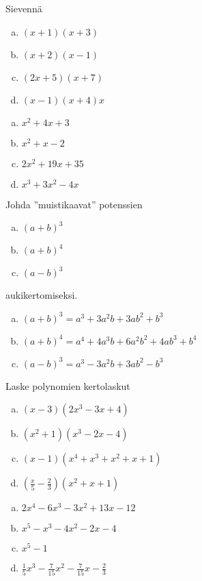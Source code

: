 \begin{tehtava}
    Sievennä
    \begin{enumerate}[a)]
        \item $(x+1)(x+3)$
        \item $(x+2)(x-1)$
        \item $(2x+5)(x+7)$
        \item $(x-1)(x+4)x$
    \end{enumerate}
    \begin{vastaus}
        \begin{enumerate}[a)]
            \item $x^2 + 4x + 3$
            \item $x^2 + x - 2$
            \item $2x^2 + 19x + 35$
            \item $x^3 + 3x^2 - 4x$
        \end{enumerate}
    \end{vastaus}
\end{tehtava}

\begin{tehtava}
    Johda ''muistikaavat'' potenssien
    \begin{enumerate}[a)]
            \item $(a+b)^3$
            \item $(a+b)^4$
            \item $(a-b)^3$
        \end{enumerate}
        aukikertomiseksi.
    \begin{vastaus}
        \begin{enumerate}[a)]
            \item $(a+b)^3 = a^3 + 3a^2b + 3ab^2 + b^3$
            \item $(a+b)^4 = a^4 + 4a^3b + 6a^2b^2 + 4ab^3 + b^4$
            \item $(a-b)^3 = a^3 - 3a^2b + 3ab^2 - b^3$
        \end{enumerate}
    \end{vastaus}
\end{tehtava}

\begin{tehtava}
	Laske polynomien kertolaskut
	\begin{enumerate}[a)]
		\item $(x-3)(2x^3-3x+4)$
		\item $(x^2+1)(x^3-2x-4)$
		\item $(x-1)(x^4+x^3+x^2+x+1)$
		\item $(\frac x5-\frac23)(x^2+x+1)$
	\end{enumerate}
	\begin{vastaus}
		\begin{enumerate}[a)]
			\item $2x^4-6x^3-3x^2+13x-12$
			\item $x^5-x^3-4x^2-2x-4$
			\item $x^5-1$
			\item $\frac15x^3-\frac{7}{15}x^2-\frac{7}{15}x-\frac23$
		\end{enumerate}
	\end{vastaus}
\end{tehtava}
